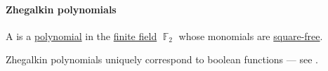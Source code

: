 \paragraph{Zhegalkin polynomials}

\begin{definition}\label{def:zhegalkin_polynomial}
  A  is a \hyperref[def:polynomial_algebra/polynomials]{polynomial} in the \hyperref[def:finite_field]{finite field} \( \BbbF_2 \) whose monomials are \hyperref[def:square_free_element]{square-free}.
\end{definition}
\begin{comments}
  \item Zhegalkin polynomials uniquely correspond to boolean functions --- see .
\end{comments}

